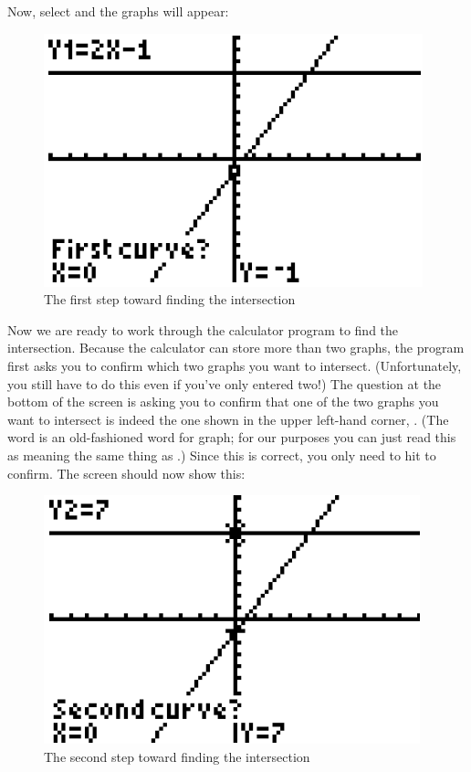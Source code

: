 Now, select  and the graphs will appear:

\begin{figure}[H]
	\centering
	\includegraphics[scale=1.0]{Sections/SolvingEquationsGraphically/Figure06.png}
	\caption{The first step toward finding the intersection}
\end{figure}

Now we are ready to work through the calculator program to find the intersection. Because the calculator can store more than two graphs, the program first asks you to confirm which two graphs you want to intersect. (Unfortunately, you still have to do this even if you’ve only entered two!) The  question at the bottom of the screen is asking you to confirm that one of the two graphs you want to intersect is indeed the one shown in the upper left-hand corner, .
(The word  is an old-fashioned word for graph; for our purposes you can just read this as meaning the same thing as .) Since this is correct, you only need to hit  to confirm.  The screen should now show this:

\begin{figure}[H]
	\centering
	\includegraphics[scale=1.0]{Sections/SolvingEquationsGraphically/Figure07.png}
	\caption{The second step toward finding the intersection}
\end{figure}


